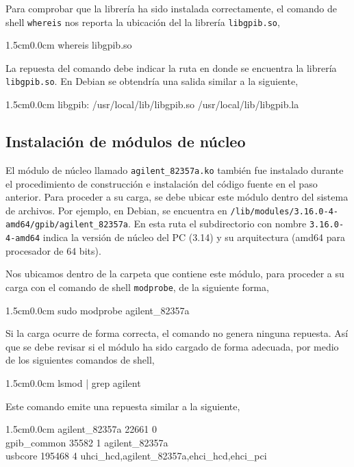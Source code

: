 \documentclass[paper=letter,oneside,fontsize=11pt, parskip=full]{scrartcl}
\newenvironment{code}
	{\begin{adjustwidth}{1.5cm}{0.0cm}\ttfamily}
	{\end{adjustwidth}}
\begin{document}
		Para comprobar que la librería ha sido instalada correctamente, el comando de shell \texttt{whereis} nos reporta la ubicación del la librería \texttt{libgpib.so},
		
		\begin{code}
			whereis libgpib.so
		\end{code}
		
		La repuesta del comando debe indicar la ruta en donde se encuentra la librería \texttt{libgpib.so}. En Debian se obtendría una salida similar a la siguiente,

		\begin{code}		
			libgpib: /usr/local/lib/libgpib.so /usr/local/lib/libgpib.la
		\end{code}
	
		\subsection{Instalación de módulos de núcleo}
		
		El módulo de núcleo llamado \texttt{agilent\_82357a.ko} también fue instalado durante el procedimiento de construcción e instalación del código fuente en el paso anterior. Para proceder a su carga, se debe ubicar este módulo dentro del sistema de archivos. Por ejemplo, en Debian, se encuentra en \texttt{/lib/modules/3.16.0-4-amd64/gpib/agilent\_82357a}. En esta ruta el subdirectorio con nombre \texttt{3.16.0-4-amd64} indica la versión de núcleo del PC (3.14) y su arquitectura (amd64 para procesador de 64 bits). 
		
		Nos ubicamos dentro de la carpeta que contiene este módulo, para proceder a su carga con el comando de shell \texttt{modprobe}, de la siguiente forma,
		
		\begin{code}
			sudo modprobe agilent\_82357a
		\end{code}
		
		Si la carga ocurre de forma correcta, el comando no genera ninguna repuesta. Así que se debe revisar si el módulo ha sido cargado de forma adecuada, por medio de los siguientes comandos de shell,
		
		\begin{code}		
			lsmod | grep agilent
		\end{code}
	
		Este comando emite una repuesta similar a la siguiente,

		\begin{code}
			agilent\_82357a	22661  0 \\				
			gpib\_common	35582  1 agilent\_82357a  \\				
			usbcore	195468  4 uhci\_hcd,agilent\_82357a,ehci\_hcd,ehci\_pci \\
		\end{code}
		
\end{document}
